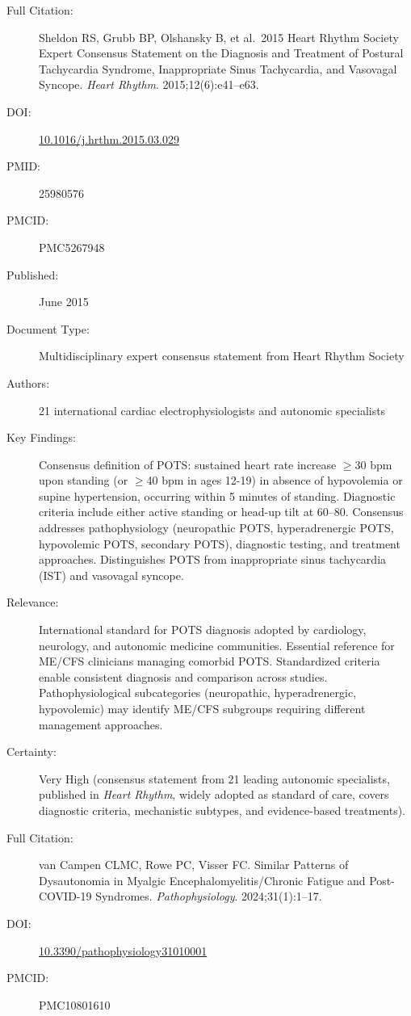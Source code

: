 \begin{description}
    \item[Full Citation:] Sheldon RS, Grubb BP, Olshansky B, et al.\ 2015 Heart Rhythm Society Expert Consensus Statement on the Diagnosis and Treatment of Postural Tachycardia Syndrome, Inappropriate Sinus Tachycardia, and Vasovagal Syncope. \textit{Heart Rhythm}. 2015;12(6):e41--e63.
    \item[DOI:] \href{https://doi.org/10.1016/j.hrthm.2015.03.029}{10.1016/j.hrthm.2015.03.029}
    \item[PMID:] 25980576
    \item[PMCID:] PMC5267948
    \item[Published:] June 2015
    \item[Document Type:] Multidisciplinary expert consensus statement from Heart Rhythm Society
    \item[Authors:] 21 international cardiac electrophysiologists and autonomic specialists
    \item[Key Findings:] Consensus definition of POTS: sustained heart rate increase $\geq$30 bpm upon standing (or $\geq$40 bpm in ages 12-19) in absence of hypovolemia or supine hypertension, occurring within 5 minutes of standing. Diagnostic criteria include either active standing or head-up tilt at 60--80\textdegree{}. Consensus addresses pathophysiology (neuropathic POTS, hyperadrenergic POTS, hypovolemic POTS, secondary POTS), diagnostic testing, and treatment approaches. Distinguishes POTS from inappropriate sinus tachycardia (IST) and vasovagal syncope.
    \item[Relevance:] International standard for POTS diagnosis adopted by cardiology, neurology, and autonomic medicine communities. Essential reference for ME/CFS clinicians managing comorbid POTS. Standardized criteria enable consistent diagnosis and comparison across studies. Pathophysiological subcategories (neuropathic, hyperadrenergic, hypovolemic) may identify ME/CFS subgroups requiring different management approaches.
    \item[Certainty:] Very High (consensus statement from 21 leading autonomic specialists, published in \textit{Heart Rhythm}, widely adopted as standard of care, covers diagnostic criteria, mechanistic subtypes, and evidence-based treatments).
\end{description}

\begin{description}
    \item[Full Citation:] van Campen CLMC, Rowe PC, Visser FC. Similar Patterns of Dysautonomia in Myalgic Encephalomyelitis/Chronic Fatigue and Post-COVID-19 Syndromes. \textit{Pathophysiology}. 2024;31(1):1--17.
    \item[DOI:] \href{https://doi.org/10.3390/pathophysiology31010001}{10.3390/pathophysiology31010001}
    \item[PMCID:] PMC10801610
\end{description}

